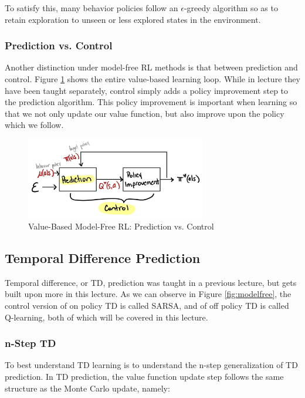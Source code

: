 \documentclass[11pt]{article}
\begin{document}
To satisfy this, many behavior policies follow an $\epsilon$-greedy algorithm so as to retain exploration to unseen or less explored states in the environment.

\subsubsection{Prediction vs. Control}

Another distinction under model-free RL methods is that between prediction and control. Figure \ref{fig:predvcontrol} shows the entire value-based learning loop. While in lecture they have been taught separately, control simply adds a policy improvement step to the prediction algorithm. This policy improvement is important when learning so that we not only update our value function, but also improve upon the policy which we follow.

\begin{figure}[H]
    \centering
    \includegraphics[width=0.7\textwidth]{images/Page2 2.jpg}
    \caption{Value-Based Model-Free RL: Prediction vs. Control}
    \label{fig:predvcontrol}
\end{figure}


\subsection{Temporal Difference Prediction}

Temporal difference, or TD, prediction was taught in a previous lecture, but gets built upon more in this lecture. As we can observe in Figure \ref{fig:modelfree}, the control version of on policy TD is called SARSA, and of off policy TD is called Q-learning, both of which will be covered in this lecture. 

\subsubsection{n-Step TD}

To best understand TD learning is to understand the n-step generalization of TD prediction. In TD prediction, the value function update step follows the same structure as the Monte Carlo update, namely:
\end{document}
